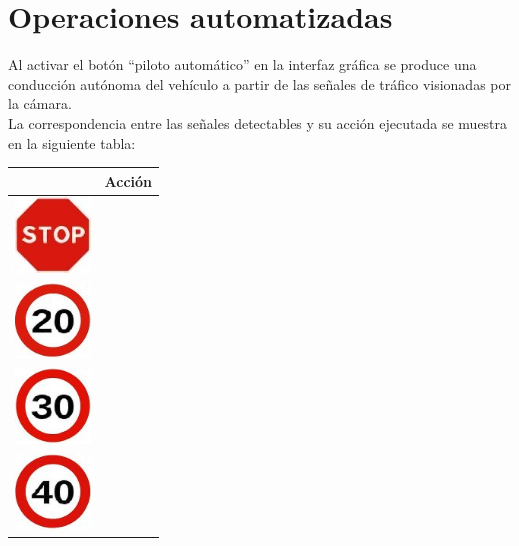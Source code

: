 \section{Operaciones automatizadas}
\label{sec:operaciones-automatizadas}

Al activar el botón ``piloto automático'' en la interfaz gráfica se produce una conducción autónoma del vehículo a partir de las señales de tráfico visionadas por la cámara.\\

La correspondencia entre las señales detectables y su acción ejecutada se muestra en la siguiente tabla:\\

\clearpage

\begin{table}[H]
  \begin{center}
    \begin{tabular}{|p{2cm}|p{8cm}|}
      \hline
      \centering{Señal} & \qquad \quad Acción \\
      \hline \includegraphics[width=2cm]{./imagenes/1.jpg} & \vspace*{-.8in}{Orden automática de parada.} \\
      \hline \includegraphics[width=2cm]{./imagenes/2.jpg} & \vspace*{-.8in}{Velocidad fijada a 20*.} \\
      \hline \includegraphics[width=2cm]{./imagenes/3.jpg} & \vspace*{-.8in}{Velocidad fijada a 30*.} \\
      \hline \includegraphics[width=2cm]{./imagenes/4.jpg} & \vspace*{-.8in}{Velocidad fijada a 40*.} \\

\end{tabular}
\end{center}
\end{table}
